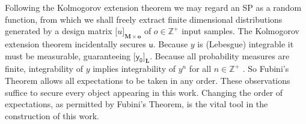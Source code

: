 \documentclass[preprint,12pt]{elsarticle}
\newcommand*{\x}{\times}
\newcommand*{\mi}[1]{\mathbf{#1}}
\newcommand*{\st}[1]{\mathbb{#1}}
\newcommand*{\rv}[1]{\mathsf{#1}}
\newcommand*{\tte}[2][]{\lbrack{#2}\rbrack_{#1}}
\begin{document}
    Following the Kolmogorov extension theorem \cite[pp.124]{Rogers.Williams2000} we may regard an SP as a random function, from which we shall freely extract finite dimensional distributions generated by a design matrix $\tte[\mi{M\x o}]{u}$ of $o \in \st{Z}^{+}$ input samples.
    The Kolmogorov extension theorem incidentally secures $\rv{u}$. 
    Because $y$ is (Lebesgue) integrable it must be measurable, guaranteeing $\tte[\mi{L}]{\rv{y_0}}$.
    Because all probability measures are finite, integrability of $y$ implies integrability of $y^n$ for all $n \in \st{Z}^{+}$ \cite{Villani1985}. 
    So Fubini's Theorem \cite[pp.77]{Williams1991} allows all expectations to be taken in any order. These observations suffice to secure every object appearing in this work. Changing the order of expectations, as permitted by Fubini's Theorem, is the vital tool in the construction of this work. 
\end{document}
